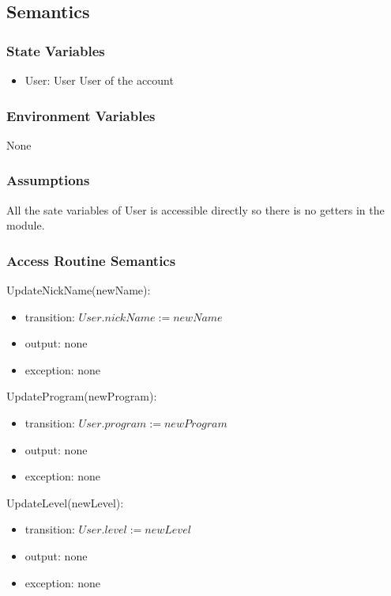 \documentclass[12pt, titlepage]{article}
\begin{document}
\subsection{Semantics}

\subsubsection{State Variables}

\begin{itemize}
\item User: User
User of the account
\end{itemize}

\subsubsection{Environment Variables}

None

\subsubsection{Assumptions}

All the sate variables of User is accessible directly so there is no getters in the module.

\subsubsection{Access Routine Semantics}

\noindent UpdateNickName(newName):
\begin{itemize}
\item transition: $User.nickName := newName$
\item output: none
\item exception: none
\end{itemize}

\noindent UpdateProgram(newProgram):
\begin{itemize}
\item transition: $User.program := newProgram$
\item output: none
\item exception: none
\end{itemize}

\noindent UpdateLevel(newLevel):
\begin{itemize}
\item transition: $User.level := newLevel$
\item output: none
\item exception: none
\end{itemize}
\end{document}
